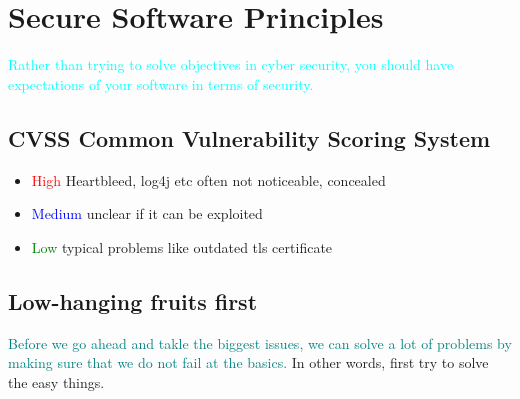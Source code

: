 \documentclass[main.tex,fontsize=8pt,paper=a4,paper=portrait,DIV=calc,]{scrartcl}
\begin{document}
\tableofcontents

\newcommand{\TITLE}{Secure Software}
\newcommand{\AUTHOR}{Fabio Lenherr}
\setcounter{tocdepth}{1}

\section{Secure Software Principles}
\textcolor{Cyan}{Rather than trying to solve objectives in cyber security, you should have expectations of your software in terms of security.}

\subsection{CVSS Common Vulnerability Scoring System}
\begin{itemize}
  \item \textcolor{red}{High}\newline
    Heartbleed, log4j etc\newline
    often not noticeable, concealed
  \item \textcolor{blue}{Medium}\newline
    unclear if it can be exploited
  \item \textcolor{green}{Low}\newline
    typical problems like outdated tls certificate
\end{itemize}

\subsection{Low-hanging fruits first}
\textcolor{teal}{Before we go ahead and takle the biggest issues, we can solve a lot of problems by making sure that we do not fail at the basics.}\newline
In other words, first try to solve the easy things.
\end{document}
